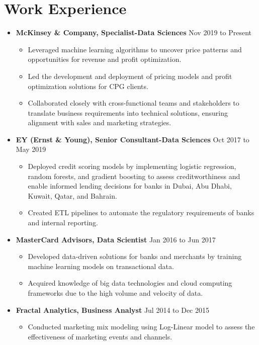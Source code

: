 \documentclass[a4paper,10pt]{article}
\begin{document}
\section*{Work Experience}
\begin{itemize}[leftmargin=0.2cm, label={}]
    \item \textbf{McKinsey \& Company, Specialist-Data Sciences} \hfill \textnormal{Nov 2019 to Present}
    \begin{itemize}[leftmargin=0.5cm, label={\textbullet}]
        \item Leveraged machine learning algorithms to uncover price patterns and opportunities for revenue and profit optimization.
        \item Led the development and deployment of pricing models and profit optimization solutions for CPG clients.
        \item Collaborated closely with cross-functional teams and stakeholders to translate business requirements into technical solutions, ensuring alignment with sales and marketing strategies.
    \end{itemize}
    
    \item \textbf{EY (Ernst \& Young), Senior Consultant-Data Sciences} \hfill \textnormal{Oct 2017 to May 2019}
    \begin{itemize}[leftmargin=0.5cm, label={\textbullet}]
        \item Deployed credit scoring models by implementing logistic regression, random forests, and gradient boosting to assess creditworthiness and enable informed lending decisions for banks in Dubai, Abu Dhabi, Kuwait, Qatar, and Bahrain.
        \item Created ETL pipelines to automate the regulatory requirements of banks and internal reporting.
    \end{itemize}
    
    \item \textbf{MasterCard Advisors, Data Scientist} \hfill \textnormal{Jan 2016 to Jun 2017}
    \begin{itemize}[leftmargin=0.5cm, label={\textbullet}]
        \item Developed data-driven solutions for banks and merchants by training machine learning models on transactional data.
        \item Acquired knowledge of big data technologies and cloud computing frameworks due to the high volume and velocity of data.
    \end{itemize}
    
    \item \textbf{Fractal Analytics, Business Analyst} \hfill \textnormal{Jul 2014 to Dec 2015}
    \begin{itemize}[leftmargin=0.5cm, label={\textbullet}]
        \item Conducted marketing mix modeling using Log-Linear model to assess the effectiveness of marketing events
        and channels.
    \end{itemize}
\end{itemize}
\end{document}
